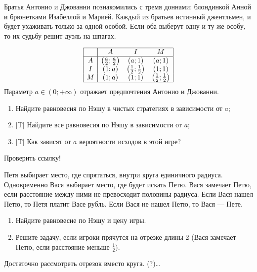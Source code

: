 \begin{problem}
Братья Антонио и Джованни познакомились с тремя доннами: блондинкой Анной и брюнетками Изабеллой и Марией. Каждый из братьев истинный джентльмен, и будет ухаживать только за одной особой. Если оба выберут одну и ту же особу, то их судьбу решит дуэль на шпагах.

\[\begin{array}{|c|ccc|}  \hline {} & {A} & {I} & {M} \\  \hline {A} & {\left(\frac{a}{2} ;\frac{a}{2} \right)} & {\left(a;1\right)} & {\left(a;1\right)} \\ {I} & {\left(1;a\right)} & {\left(\frac{1}{2} ;\frac{1}{2} \right)} & {\left(1;1\right)} \\ {M} & {\left(1;a\right)} & {\left(1;1\right)} & {\left(\frac{1}{2} ;\frac{1}{2} \right)} \\  \hline  \end{array}\]
Параметр  $a\in \left(0;+\infty \right)$  отражает предпочтения Антонио и Джованни.
\begin{enumerate}
\par
\item 	Найдите равновесия по Нэшу в чистых стратегиях в зависимости от  $a$;\par
\item 	$[$T$]$ Найдите все равновесия по Нэшу в зависимости от  $a$; \par
\item 	$[$T$]$ Как зависят от  $a$  вероятности исходов в этой игре?
\end{enumerate}


\begin{sol}

\end{sol}
\end{problem}



\begin{problem}
\begin{source}
 \cite{lones:dtc} {\red Проверить ссылку!}
\end{source}
Петя выбирает место,  где спрятаться, внутри круга единичного радиуса. Одновременно Вася выбирает место, где будет искать Петю. Вася замечает Петю, если расстояние между ними не превосходит половины радиуса. Если Вася нашел Петю, то Петя платит Васе рубль. Если Вася не нашел Петю, то Вася — Пете. \par
\begin{enumerate}
\item  Найдите равновесие по Нэшу и цену игры. \par
\item Решите задачу, если игроки прячутся на отрезке длины 2 (Вася замечает Петю, если расстояние меньше $\frac{1}{2}$).
\end{enumerate}


\begin{sol}

Достаточно рассмотреть отрезок вместо круга. (?)\ldots
\end{sol}
\end{problem}




